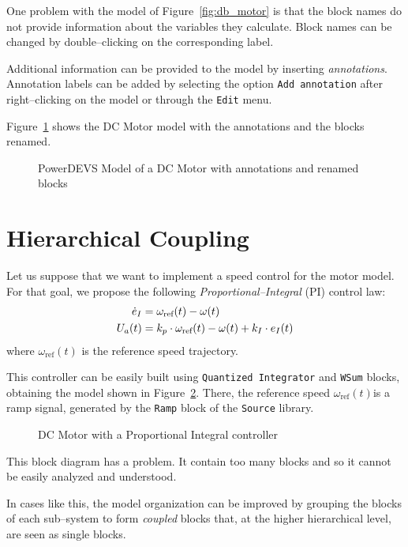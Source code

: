 One problem with the model of Figure~\ref{fig:db_motor} is that the block names do not provide information about the variables they calculate. Block names can be changed by double--clicking on the corresponding label.

Additional information can be provided to the model by inserting \emph{annotations}. Annotation labels can be added by selecting the option \verb"Add annotation" after right--clicking on the model or through the \verb"Edit" menu. 

Figure~\ref{fig:db_motor2} shows the DC Motor model with the annotations and the blocks renamed.

\begin{figure}[h]
 \caption{PowerDEVS Model of a DC Motor with annotations and renamed blocks}
 \label{fig:db_motor2}
\end{figure}

\FloatBarrier

\section{Hierarchical Coupling}
Let us suppose that we want to implement a speed control for the motor model. For that goal, we propose the following \emph{Proportional--Integral} (PI) control law:
\begin{equation*}
 \begin{split}
  \dot e_I&=\omega_{\text{ref}}(t)-\omega(t)\\
  U_a(t) &=k_p \cdot \omega_{\text{ref}}(t)-\omega(t) + k_I \cdot e_I(t)
 \end{split}
\end{equation*}
where $ \omega_{\text{ref}}(t)$ is the reference speed trajectory. 

This controller can be easily built using \verb"Quantized Integrator" and \verb"WSum" blocks, obtaining the model shown in Figure~\ref{fig:db_pi_motor}. There, the reference speed $\omega_{\text{ref}}(t)$is a ramp signal, generated by the \verb"Ramp" block of the \verb"Source" library.

\begin{figure}[h]
 \caption{DC Motor with a Proportional Integral controller}
 \label{fig:db_pi_motor}
\end{figure}

This block diagram has a problem. It contain too many blocks and so it cannot be easily analyzed and understood. 

In cases like this, the model organization can be improved by grouping the blocks of each sub--system to form \emph{coupled} blocks that, at the higher hierarchical level, are seen as single blocks.

